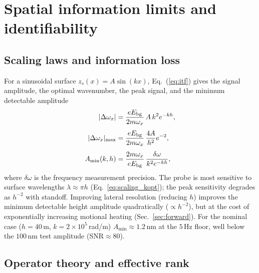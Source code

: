 \documentclass[12pt,a4paper]{article}
\begin{document}
\section{Spatial information limits and identifiability}
\label{sec:info}

\subsection{Scaling laws and information loss}

For a sinusoidal surface $z_s(x)=A\sin(kx)$, Eq.~(\ref{eq:itf}) gives the
signal amplitude, the optimal wavenumber, the peak signal, and the minimum
detectable amplitude
\begin{align}
|\Delta\omega_x| &= \frac{eE_{\rm bg}}{2m\omega_x}\,A\,k^2 e^{-kh},
\label{eq:scaling_signal} \\[4pt]
|\Delta\omega_x|_{\rm max} &= \frac{eE_{\rm bg}}{2m\omega_x}\,
        \frac{4A}{h^2}e^{-2},
\label{eq:scaling_peak} \\[4pt]
A_{\rm min}(k,h) &= \frac{2m\omega_x}{eE_{\rm bg}}\,
        \frac{\delta\omega}{k^2 e^{-kh}},
\label{eq:scaling_amin}
\end{align}
where $\delta\omega$ is the frequency measurement precision.  The probe is
most sensitive to surface wavelengths $\lambda\approx\pi h$
(Eq.~\ref{eq:scaling_kopt}); the peak sensitivity degrades as $h^{-2}$
with standoff.  Improving lateral resolution (reducing $h$) improves the
minimum detectable height amplitude quadratically ($\propto h^{-2}$), but
at the cost of exponentially increasing motional heating
(Sec.~\ref{sec:forward}).  For the nominal case ($h=40$\,\textmu m,
$k=2\times10^5$\,rad/m) $A_{\min}\approx1.2$\,nm at the $5$\,Hz floor,
well below the $100$\,nm test amplitude (SNR$\approx80$).

\subsection{Operator theory and effective rank}
\end{document}
